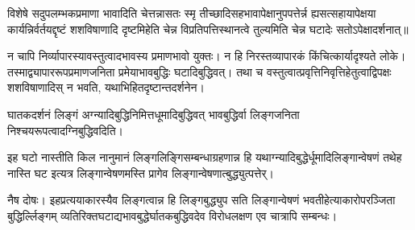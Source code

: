विशेष\mme े सदुपलम्भकप्रमाणा%
भावादिति चेत्तन्नासतः स्मृ%
तीच्छादिसहभावापेक्षानुपपत्तेर्न्न ह्यसत्सहायापेक्षया कार्य\mms न्निर्वर्तयद्दृष्टं शशविषाणा\mme दि दृष्टमिहेति चेन्न विप्रतिपत्तिस्थानत्वे
तुल्यमिति चेन्न घटादेः सतोऽपेक्षादर्शनात्॥

न चापि निर्व्यापारस्यावस्तुत्वादभावस्य प्रमाणभावो युक्तः। %
न हि निरस्तव्यापारकं किंच\mms ित्कार्या\mme{}दृश्यते लोके। %
तस्माद्व्यापाररूपप्रमाणजनिता प्रमेयाभावबुद्धिः
%
घटादिबुद्धिवत्। तथा च वस्तुत्वात्प्रवृत्तिनिवृत्तिहेतुत्वाद्विपक्षः शशविषाणादिस्%
न भवति, यथाभिहितदृष्टान्तदर्शनेन।

घातकदर्शनं लिङ्गं
अग्न्यादिबुद्धिनिमित्तधूमादिबुद्धिवत्%
भावबुद्धिर्वा लिङ्गजनिता निश्चयरूपत्वादग्निबुद्धिवदिति। %

इह घटो नास्तीति किल नानुमानं लिङ्गलिङ्गिसम्बन्धाग्रहणान्न हि यथाग्न्यादिबुद्धेर्धूमादिलिङ्गान्वेषणं तथेह नास्ति घट %
इत्यत्र लिङ्गान्वेषणमस्ति प्रागेव लिङ्गान्वेषणात्बुद्ध्युत्पत्तेर्। %

नैष दोषः। इहप्रत्ययाकारस्यैव लिङ्गत्वान्न हि
लिङ्गबुद्ध्युप
सति लिङ्गान्वेषणं भवतीहेत्याकारोपरञ्जिता बुद्धिर्ल्लिङ्गम्
व्यतिरिक्तघटाद्यभावबुद्धेर्घातकबुद्धिवदेव विरोधलक्षण एव चात्रापि सम्बन्धः।

